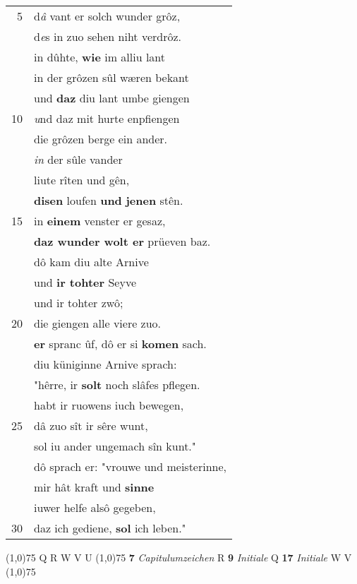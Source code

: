 \documentclass[8pt,a4paper,notitlepage]{article}
\begin{document}
\begin{table}[ht]
\begin{minipage}[t]{0.5\linewidth}
\begin{tabular}{rl}
5 & d\textit{â} vant er solch wunder grôz,\\ 
 & d\textit{e}s in zuo sehen niht verdrôz.\\ 
 & in dûhte, \textbf{wie} im alliu lant\\ 
 & in der grôzen sûl wæren bekant\\ 
 & und \textbf{daz} diu lant umbe giengen\\ 
10 & \textit{u}nd daz mit hurte enpfiengen\\ 
 & die grôzen berge ein ander.\\ 
 & \textit{in} der sûle vander\\ 
 & liute rîten und gên,\\ 
 & \textbf{disen} loufen \textbf{und} \textbf{jenen} stên.\\ 
15 & in \textbf{einem} venster er gesaz,\\ 
 & \textbf{daz wunder wolt er} prüeven baz.\\ 
 & dô kam diu alte Arnive\\ 
 & und \textbf{ir tohter} Seyve\\ 
 & und ir tohter zwô;\\ 
20 & die giengen alle viere zuo.\\ 
 & \textbf{er} spranc ûf, dô er si \textbf{komen} sach.\\ 
 & diu küniginne Arnive sprach:\\ 
 & "hêrre, ir \textbf{solt} noch slâfes pflegen.\\ 
 & habt ir ruowens iuch bewegen,\\ 
25 & dâ zuo sît ir sêre wunt,\\ 
 & sol iu ander ungemach sîn kunt."\\ 
 & dô sprach er: "vrouwe und meisterinne,\\ 
 & mir hât kraft und \textbf{sinne}\\ 
 & iuwer helfe alsô gegeben,\\ 
30 & daz ich gediene, \textbf{sol} ich leben."\\ 
\end{tabular}
\scriptsize
\line(1,0){75} \newline
Q R W V U \newline
\line(1,0){75} \newline
\textbf{7} \textit{Capitulumzeichen} R  \textbf{9} \textit{Initiale} Q  \textbf{17} \textit{Initiale} W V  \newline
\line(1,0){75} \newline

\end{minipage}
\end{table}
\end{document}
